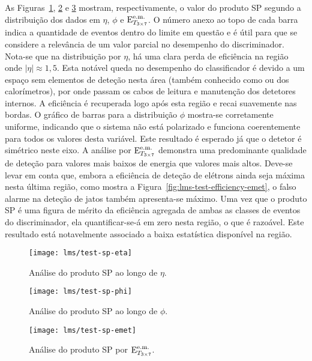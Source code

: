 As Figuras~\ref{fig:lms-test-sp-eta}, \ref{fig:lms-test-sp-phi} e
\ref{fig:lms-test-sp-emet} mostram, respectivamente, o valor do produto SP segundo
a distribuição dos dados em $\eta$, $\phi$ e $\text{E}^{\text{e.m.}}_{T_{3\times7}}$. O número anexo ao topo
de cada barra indica a quantidade de eventos dentro do limite em questão e é
útil para que se considere a relevância de um valor parcial no desempenho do
discriminador. Nota-se que na distribuição por $\eta$, há uma clara perda de
eficiência na região onde $|\eta| \approx 1,5$. Esta notável queda no
desempenho do classificador é devido a um espaço sem elementos de deteção
nesta área (também conhecido como  ou  dos calorímetros),
por onde passam os cabos de leitura e manutenção dos detetores internos. A
eficiência é recuperada logo após esta região e recai suavemente nas bordas. O
gráfico de barras para a distribuição $\phi$ mostra-se corretamente uniforme,
indicando que o sistema não está polarizado e funciona coerentemente para
todos os valores desta variável. Este resultado é esperado já que o detetor é
simétrico neste eixo. A análise por $\text{E}^{\text{e.m.}}_{T_{3\times7}}$ demonstra uma predominante
qualidade de deteção para valores mais baixos de energia que valores mais
altos. Deve-se levar em conta que, embora a eficiência de deteção de elétrons
ainda seja máxima nesta última região, como mostra a
Figura~\ref{fig:lms-test-efficiency-emet}, o falso alarme na deteção de jatos
também apresenta-se máximo. Uma vez que o produto SP é uma figura de mérito da
eficiência agregada de ambas as classes de eventos do discriminador, ela
quantificar-se-á em zero nesta região, o que é razoável. Este resultado está
notavelmente associado a baixa estatística disponível na região.

\begin{figure}
\begin{center}
\texttt{[image: lms/test-sp-eta]}
\end{center}
\caption{Análise do produto SP ao longo de $\eta$.}
\label{fig:lms-test-sp-eta}
\end{figure}

\begin{figure}
\begin{center}
\texttt{[image: lms/test-sp-phi]}
\end{center}
\caption{Análise do produto SP ao longo de $\phi$.}
\label{fig:lms-test-sp-phi}
\end{figure}

\begin{figure}
\begin{center}
\texttt{[image: lms/test-sp-emet]}
\end{center}
\caption{Análise do produto SP por $\text{E}^{\text{e.m.}}_{T_{3\times7}}$.}
\label{fig:lms-test-sp-emet}
\end{figure}

